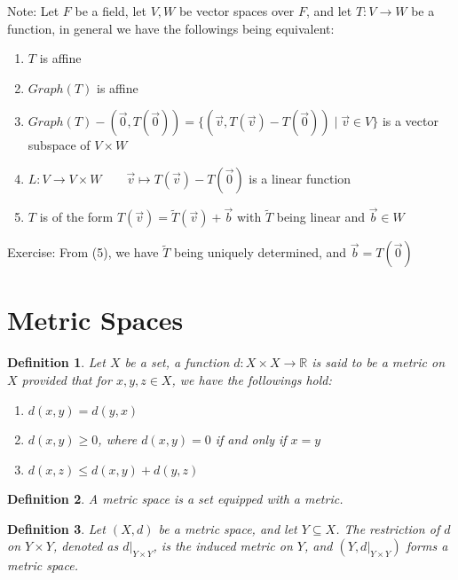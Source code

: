 \documentclass[15pt]{book}
\theoremstyle{break}
\theoremstyle{break}
\newtheorem{defn}{Definition}[corL]
\newcommand{\R}{\mathbb{R}}
\newcommand{\note}{\color{red}Note: \color{black}}
\newcommand{\exercise}{\color{green}Exercise: \color{black}}
\begin{document}
\hfill\break
\note Let $F$ be a field, let $V,W$ be vector spaces over $F$, and let $T:V\to W$ be a function, in general we have the followings being equivalent:
\begin{enumerate}[topsep=3pt,itemsep=-1ex,partopsep=1ex,parsep=1ex]
\item $T$ is affine
\item $Graph(T)$ is affine
\item $Graph(T)-(\vec{0},T(\vec{0})) = \{(\vec{v},T(\vec{v})-T(\vec{0}))\mid \vec{v}\in V\}$ is a vector subspace of $V \times W$
\item $L:V\to V\times W \qquad \vec{v}\mapsto T(\vec{v})-T(\vec{0})$ is a linear function
\item $T$ is of the form $T(\vec{v}) = \widetilde{T}(\vec{v})+\vec{b}$ with $\widetilde{T}$ being linear and $\vec{b}\in W$
\end{enumerate}

\exercise From (5), we have $\widetilde{T}$ being uniquely determined, and $\vec{b} = T(\vec{0})$
\newpage

\section[Metric Spaces]{\color{red}Metric Spaces\color{black}}

\begin{defn}
Let $X$ be a set, a function $d:X \times X \to \R$ is said to be a metric on $X$ provided that for $x,y,z\in X$, we have the followings hold:
\begin{enumerate}[topsep=3pt,itemsep=-1ex,partopsep=1ex,parsep=1ex]
\item $d(x,y) = d(y,x)$
\item $d(x,y)\geq 0$, where $d(x,y) = 0$ if and only if $x=y$
\item $d(x,z) \leq d(x,y)+d(y,z)$
\end{enumerate}
\end{defn}

\begin{defn}
A metric space is a set equipped with a metric.
\end{defn}

\begin{defn}
Let $(X,d)$ be a metric space, and let $Y\subseteq X$. The restriction of $d$ on $Y\times Y$, denoted as $d|_{Y\times Y}$, is the induced metric on $Y$, and $(Y,d|_{Y\times Y})$ forms a metric space.
\end{defn}
\end{document}
